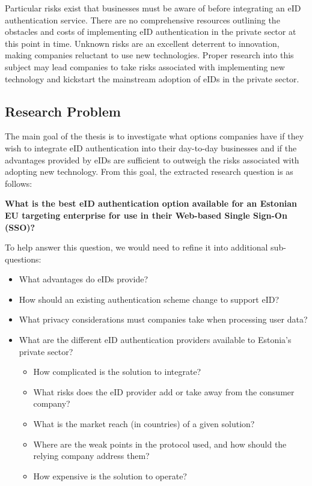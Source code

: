 Particular risks exist that businesses must be aware of before integrating an eID authentication service. There are no comprehensive resources outlining the obstacles and costs of implementing eID authentication in the private sector at this point in time. Unknown risks are an excellent deterrent to innovation, making companies reluctant to use new technologies. Proper research into this subject may lead companies to take risks associated with implementing new technology and kickstart the mainstream adoption of eIDs in the private sector.

\subsection{Research Problem}

The main goal of the thesis is to investigate what options companies have if they wish to integrate eID authentication into their day-to-day businesses and if the advantages provided by eIDs are sufficient to outweigh the risks associated with adopting new technology. From this goal, the extracted research question is as follows:

\textbf{What is the best eID authentication option available for an Estonian EU targeting enterprise for use in their Web-based Single Sign-On (SSO)?}

To help answer this question, we would need to refine it into additional sub-questions:

\begin{itemize}
    \item What advantages do eIDs provide?
    \item How should an existing authentication scheme change to support eID?
    \item What privacy considerations must companies take when processing user data?
    \item What are the different eID authentication providers available to Estonia's private sector?
          \begin{itemize}
              \item How complicated is the solution to integrate?
              \item What risks does the eID provider add or take away from the consumer company?
              \item What is the market reach (in countries) of a given solution?
              \item Where are the weak points in the protocol used, and how should the relying company address them?
              \item How expensive is the solution to operate?
          \end{itemize}
\end{itemize}

